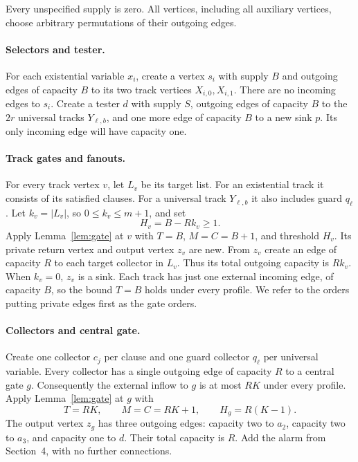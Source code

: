 \documentclass[11pt]{article}
\begin{document}
Every unspecified supply is zero. All vertices, including all auxiliary vertices, choose arbitrary permutations of their outgoing edges.

\paragraph{Selectors and tester.}
For each existential variable $x_i$, create a vertex $s_i$ with supply $B$ and outgoing edges of capacity $B$ to its two track vertices $X_{i,0},X_{i,1}$. There are no incoming edges to $s_i$. Create a tester $d$ with supply $S$, outgoing edges of capacity $B$ to the $2r$ universal tracks $Y_{\ell,b}$, and one more edge of capacity $B$ to a new sink $p$. Its only incoming edge will have capacity one.

\paragraph{Track gates and fanouts.}
For every track vertex $v$, let $L_v$ be its target list. For an existential track it consists of its satisfied clauses. For a universal track $Y_{\ell,b}$ it also includes guard $q_\ell$. Let $k_v=|L_v|$, so $0\le k_v\le m+1$, and set
\[
 H_v=B-Rk_v\ge1.
\]
Apply Lemma~\ref{lem:gate} at $v$ with $T=B$, $M=C=B+1$, and threshold $H_v$. Its private return vertex and output vertex $z_v$ are new. From $z_v$ create an edge of capacity $R$ to each target collector in $L_v$. Thus its total outgoing capacity is $Rk_v$. When $k_v=0$, $z_v$ is a sink. Each track has just one external incoming edge, of capacity $B$, so the bound $T=B$ holds under every profile. We refer to the orders putting private edges first as the gate orders.

\paragraph{Collectors and central gate.}
Create one collector $c_j$ per clause and one guard collector $q_\ell$ per universal variable. Every collector has a single outgoing edge of capacity $R$ to a central gate $g$. Consequently the external inflow to $g$ is at most $RK$ under every profile. Apply Lemma~\ref{lem:gate} at $g$ with
\[
 T=RK,\qquad M=C=RK+1,\qquad H_g=R(K-1).
\]
The output vertex $z_g$ has three outgoing edges: capacity two to $a_2$, capacity two to $a_3$, and capacity one to $d$. Their total capacity is $R$. Add the alarm from Section~4, with no further connections.
\end{document}
